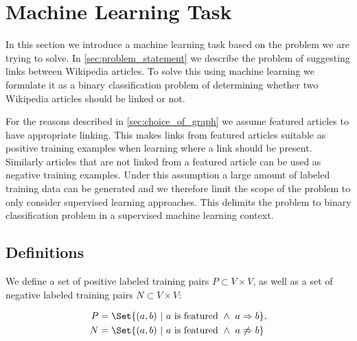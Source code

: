 \section{Machine Learning Task}\label{sec:machine_learning_task}
In this section we introduce a machine learning task based on the problem we are trying to solve. In \cref{sec:problem_statement} we describe the problem of suggesting links between Wikipedia articles. To solve this using machine learning we formulate it as a binary classification problem of determining whether two Wikipedia articles should be linked or not.

For the reasons described in \cref{sec:choice_of_graph} we assume featured articles to have appropriate linking. This makes links from featured articles suitable as positive training examples when learning where a link should be present. Similarly articles that are not linked from a featured article can be used as negative training examples.
Under this assumption a large amount of labeled training data can be generated and we therefore limit the scope of the problem to only consider supervised learning approaches. This delimits the problem to binary classification problem in a supervised machine learning context. 



\subsection{Definitions}
We define a set of positive labeled training pairs $P \subset V \times V$, as well as a set of negative labeled training pairs $N \subset V \times V$:

\begin{align*}
P &= \Set{(a,b)\ |\ a\text{ is featured}\ \wedge\ a \Rightarrow b}, \\
N &= \Set{(a,b)\ |\ a\text{ is featured}\ \wedge\ a \not\Rightarrow b}
\end{align*}

